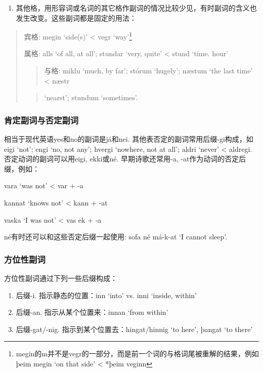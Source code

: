\begin{enumerate}
\def\labelenumi{\arabic{enumi})}
\setcounter{enumi}{2}
\item
  其他格，用形容词或名词的其它格作副词的情况比较少见，有时副词的含义也发生改变。这些副词都是固定的用法：
\end{enumerate}

\begin{quote}
宾格: megin `side(s)‌' \textless{} vegr `way‌'\footnote{megin的m并不是vegr的一部分，而是前一个词的与格词尾被重解的结果，例如þeim
  megin `on that side' \textless{} *þeim veginn}

属格: alls `of all, at all‌'; stundar `very, quite‌' \textless{} stund
`time. hour'

\begin{quote}
与格: miklu `much, by far‌'; stórum `hugely‌'; næstum `the last time‌'
\textless{} næstr
\end{quote}

\begin{quote}
`nearst'; stundum `sometimes‌'.
\end{quote}
\end{quote}

\subsubsection{肯定副词与否定副词}\label{ux80afux5b9aux526fux8bcdux4e0eux5426ux5b9aux526fux8bcd}

相当于现代英语yes和no的副词是já和nei.
其他表否定的副词常用后缀-gi构成，如eigi `not‌'; engi `no, not any‌';
hvergi `nowhere, not at all‌'; aldri `never‌' \textless{} aldregi.
否定动词的副词可以用eigi, ekki或né. 早期诗歌还常用-a,
-at作为动词的否定后缀，例如：

vara `was not' \textless{} var + -a

kannat `knows not' \textless{} kann + -at

vaska `I was not‌' \textless{} vas ek + -a

né有时还可以和这些否定后缀一起使用: sofa né má-k-at `I cannot sleep‌'.

\subsubsection{方位性副词}\label{ux65b9ux4f4dux6027ux526fux8bcd}

方位性副词通过下列一些后缀构成：

\begin{enumerate}
\def\labelenumi{\arabic{enumi})}
\item
  后缀-i. 指示静态的位置：inn `into‌' vs. inni `inside, within‌'
\item
  后缀-an. 指示从某个位置来：innan `from within‌'
\item
  后缀-gat/-nig. 指示到某个位置去：hingat/hinnig `to here‌', þangat `to
  there‌'
\end{enumerate}


